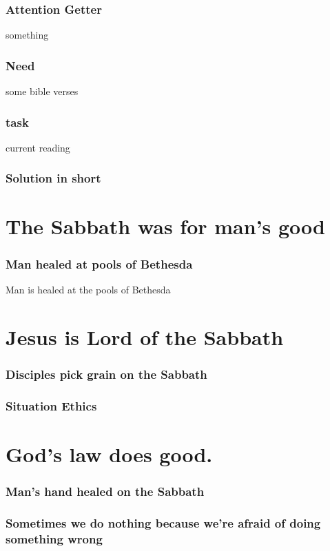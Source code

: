 \begin{frame}
\frametitle{Attention Getter}
something
\end{frame}

\begin{frame}
\frametitle{Need}
some bible verses
\end{frame}

\begin{frame}
\frametitle{task}
current reading
\end{frame}

\begin{frame}
\frametitle{Solution in short}
\end{frame}

\begin{frame}
\frametitle{\insertlecture}
\tableofcontents[sectionstyle=show/show]
\end{frame}

\section{The Sabbath was for man's good}
\begin{frame}
\frametitle{Man healed at pools of Bethesda}
Man is healed at the pools of Bethesda 
\end{frame}

\begin{frame}
\frametitle{}
\end{frame}

\section{Jesus is Lord of the Sabbath}

\begin{frame}
\frametitle{Disciples pick grain on the Sabbath}
\end{frame}

\begin{frame}
\frametitle{Situation Ethics}
\end{frame}

\section{God's law does good.}

\begin{frame}
\frametitle{Man's hand healed on the Sabbath}
\end{frame}

\begin{frame}
\frametitle{Sometimes we do nothing because we're afraid of doing something wrong}
\end{frame}

